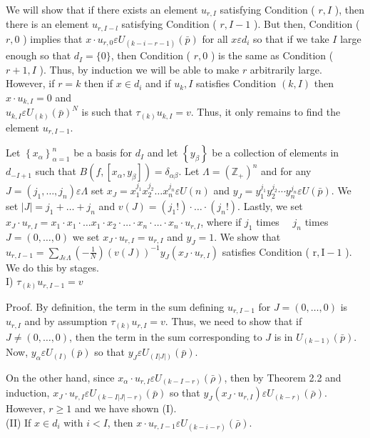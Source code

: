 \documentclass[10pt]{article}
\begin{document}
We will show that if there exists an element $u_{r, I}$ satisfying Condition ( $r, I$ ), then there is an element $u_{r, I-l}$ satisfying Condition ( $r, I-1$ ). But then, Condition ( $r, 0$ ) implies that $x \cdot u_{r, 0} \varepsilon U_{(k-i-r-1)}(\bar{p})$ for all $x \varepsilon d_{i}$ so that if we take $I$ large enough so that $d_{I}=\{0\}$, then Condition ( $r, 0$ ) is the same as Condition ( $r+1, I$ ). Thus, by induction we will be able to make $r$ arbitrarily large. However, if $r=k$ then if $x \in d_{i}$ and if $u_{k}, I$ satisfies Condition $(k, I)$ then $x \cdot u_{k, I}=0$ and\\
$u_{k, I} \varepsilon U_{(k)}(\bar{p})^{N}$ is such that $\tau_{(k)} u_{k, I}=v$. Thus, it only remains to find the element $u_{r, I-1}$.

Let $\left\{x_{\alpha}\right\}_{\alpha=1}^{n}$ be a basis for $d_{I}$ and let $\left\{y_{\beta}\right\}$ be a collection of elements in $d_{-I+1}$ such that $B\left(f,\left[x_{\alpha}, y_{\beta}\right]\right)=\delta_{\alpha \beta}$. Let $\Lambda=\left(\mathbb{Z}_{+}\right)^{n}$ and for any $J=\left(j_{1}, \ldots, j_{n}\right) \varepsilon \Lambda$ set $x_{J}=x_{1}^{j_{1}} x_{2}^{j_{2}} \ldots x_{n}^{j_{n}} \varepsilon U(n)$ and $y_{J}=y_{1}^{j_{1}} y_{2}^{j_{2}} \cdots y_{n}^{j_{n}} \varepsilon U(\bar{p})$. We set $|J|=j_{1}+\ldots+j_{n}$ and $v(J)=\left(j_{1}!\right) \cdot \ldots \cdot\left(j_{n}!\right)$. Lastly, we set $x_{J} \cdot u_{r, I}=x_{1} \cdot x_{1} \cdot \ldots x_{1} \cdot x_{2} \cdot \ldots \cdot x_{n} \cdot \ldots \cdot x_{n} \cdot u_{r, I}$, where if $j_{1}$ times $\quad j_{n}$ times $J=(0, \ldots, 0)$ we set $x_{J} \cdot u_{r, I}=u_{r, I}$ and $y_{J}=1$. We show that $u_{r, I-1}=\sum_{J \varepsilon \Lambda}\left(-\frac{1}{N}\right)(v(J))^{-1} y_{J}\left(x_{J} \cdot u_{r, I}\right)$ satisfies Condition ( $\mathrm{r}, \mathrm{I}-1$ ). We do this by stages.\\
I) $\tau_{(k)} u_{r, I-1}=v$

Proof. By definition, the term in the sum defining $u_{r, I-1}$ for $J=(0, \ldots, 0)$ is $u_{r, I}$ and by assumption $\tau_{(k)} u_{r, I}=v$. Thus, we need to show that if $J \neq(0, \ldots, 0)$, then the term in the sum corresponding to $J$ is in $U_{(k-1)}(\bar{p})$. Now, $y_{\alpha} \varepsilon U_{(I)}(\bar{p})$ so that $y_{J} \varepsilon U_{(I|J|)}(\bar{p})$.

On the other hand, since $x_{\alpha} \cdot u_{r, I} \varepsilon U_{(k-I-r)}(\bar{\rho})$, then by Theorem 2.2 and induction, $x_{J} \cdot u_{r, I} \varepsilon U_{(k-I|J|-r)}(\bar{p})$ so that $y_{J}\left(x_{J} \cdot u_{r, I}\right) \varepsilon U_{(k-r)}(\bar{\rho})$. However, $r \geq 1$ and we have shown (I).\\
(II) If $x \in d_{i}$ with $i<I$, then $x \cdot u_{r, I-1} \varepsilon U_{(k-i-r)}(\bar{\rho})$.
\end{document}
